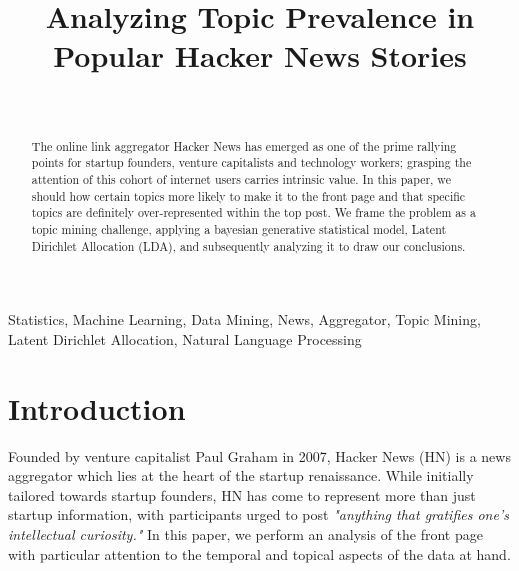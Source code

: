 \documentclass[11pt,journal,final,a4paper]{IEEEtran}
\begin{document}
\title{Analyzing Topic Prevalence in Popular Hacker News Stories\\
}

\author{ \\
}

\maketitle

\begin{abstract}
The online link aggregator Hacker News has emerged as one of the prime rallying points for startup founders, venture capitalists and technology workers; grasping the attention of this cohort of internet users carries intrinsic value. In this paper, we should how certain topics more likely to make it to the front page and that specific topics are definitely over-represented within the top post. We frame the problem as a topic mining challenge, applying a bayesian generative statistical model, Latent Dirichlet Allocation (LDA), and subsequently analyzing it to draw our conclusions.
\end{abstract}
\begin{IEEEkeywords}
Statistics, Machine Learning, Data Mining, News, Aggregator, Topic Mining, Latent Dirichlet Allocation, Natural Language Processing
\end{IEEEkeywords}

\section{Introduction}
Founded by venture capitalist Paul Graham in 2007, Hacker News (HN) is a news aggregator which lies at the heart of the startup renaissance\cite{hn:announcement}. While initially tailored towards startup founders, HN has come to represent more than just startup information, with participants urged to post \textit{"anything that gratifies one's intellectual curiosity."} In this paper, we perform an analysis of the front page with particular attention to the temporal and topical aspects of the data at hand\cite{hn:guidelines}.
\end{document}
